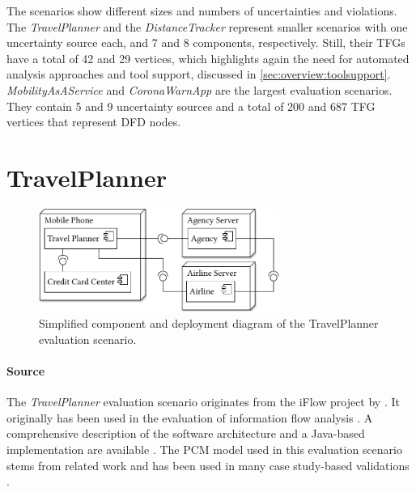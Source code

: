 The scenarios show different sizes and numbers of uncertainties and violations. The \emph{TravelPlanner} and the \emph{DistanceTracker} represent smaller scenarios with one uncertainty source each, and 7 and 8 components, respectively.
Still, their \acp{TFG} have a total of 42 and 29 vertices, which highlights again the need for automated analysis approaches and tool support, discussed in \autoref{sec:overview:toolsupport}.
\emph{MobilityAsAService} and \emph{CoronaWarnApp} are the largest evaluation scenarios.
They contain 5 and 9 uncertainty sources and a total of 200 and 687 \ac{TFG} vertices that represent \ac{DFD} nodes.





\section{TravelPlanner}%
\label{sec:evaluationscenarios:travelplanner}

\begin{figure}
    \centering
    \includegraphics[width=0.7\textwidth]{figures/chapter8/scenario1_travelplanner.pdf}
    \caption{Simplified component and deployment diagram of the TravelPlanner evaluation scenario.}
    \label{fig:evaluationscenarios:travelplanner}
\end{figure}

\paragraph{Source}
The \emph{TravelPlanner} evaluation scenario originates from the iFlow project by \textcite{katkalov_modellgetriebener_2017}.
It originally has been used in the evaluation of information flow analysis \cite{katkalov_model-driven_2013}.
A comprehensive description of the software architecture and a Java-based implementation are available \cite{katkalov_modeling_2013}.
The \ac{PCM} model used in this evaluation scenario stems from related work \cite{seifermann_architectural_2022,walter_context-based_2023} and has been used in many case study-based validations \cite{seifermann_detecting_2022,seifermann_data-driven_2019,walter_architectural_2022-1,walter_architecture-based_2023,walter_tool-based_2023,kramer_model-driven_2017,hahner_model-based_2023,hahner_modeling_2021,walter_architectural_2022,boltz_handling_2022,schwickerath_tool-supported_2023}.

